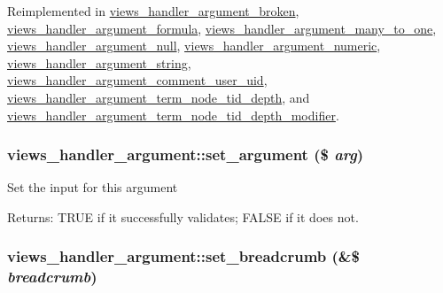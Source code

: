 Reimplemented in \hyperlink{classviews__handler__argument__broken_271044cef8ae5bc6c058ba98ab0fb56d}{views\_\-handler\_\-argument\_\-broken}, \hyperlink{classviews__handler__argument__formula_a9cb66a17cfded1800dac4c10c20f2ee}{views\_\-handler\_\-argument\_\-formula}, \hyperlink{classviews__handler__argument__many__to__one_5386934f090273137694ea9d1de32d04}{views\_\-handler\_\-argument\_\-many\_\-to\_\-one}, \hyperlink{classviews__handler__argument__null_887c3f8e9f97a75cc9d91a7b685b5f12}{views\_\-handler\_\-argument\_\-null}, \hyperlink{classviews__handler__argument__numeric_399a3c37ef1277c6b79596fa6dd037a7}{views\_\-handler\_\-argument\_\-numeric}, \hyperlink{classviews__handler__argument__string_d50bba6781755cfcd29b2a493dd838ec}{views\_\-handler\_\-argument\_\-string}, \hyperlink{classviews__handler__argument__comment__user__uid_081c8766297cd7051693061f32207709}{views\_\-handler\_\-argument\_\-comment\_\-user\_\-uid}, \hyperlink{classviews__handler__argument__term__node__tid__depth_8956dffc5b8c1b5adef8cdc6e897c7ab}{views\_\-handler\_\-argument\_\-term\_\-node\_\-tid\_\-depth}, and \hyperlink{classviews__handler__argument__term__node__tid__depth__modifier_13fb3ff5466a1c9fcd863bb4962a18c8}{views\_\-handler\_\-argument\_\-term\_\-node\_\-tid\_\-depth\_\-modifier}.\hypertarget{classviews__handler__argument_b5a0444df1eb5d71720e94a0faa0a34c}{
\subsubsection[{set\_\-argument}]{\setlength{\rightskip}{0pt plus 5cm}views\_\-handler\_\-argument::set\_\-argument (\$ {\em arg})}}
\label{classviews__handler__argument_b5a0444df1eb5d71720e94a0faa0a34c}


Set the input for this argument

\begin{Desc}
\item[Returns:]TRUE if it successfully validates; FALSE if it does not. \end{Desc}
\hypertarget{classviews__handler__argument_06263489052be463efd3c4afdf73851d}{
\subsubsection[{set\_\-breadcrumb}]{\setlength{\rightskip}{0pt plus 5cm}views\_\-handler\_\-argument::set\_\-breadcrumb (\&\$ {\em breadcrumb})}}
\label{classviews__handler__argument_06263489052be463efd3c4afdf73851d}


